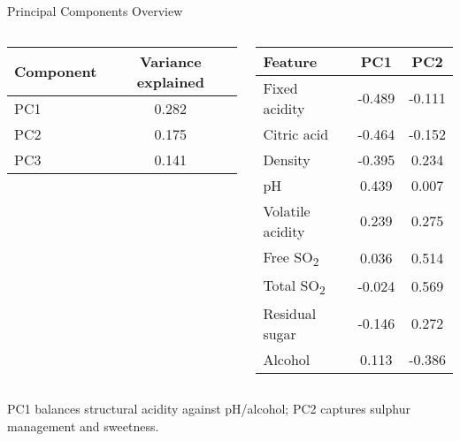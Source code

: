\documentclass[aspectratio=169]{beamer}
\begin{document}
\begin{frame}{Principal Components Overview}
  \begin{columns}[T,totalwidth=\textwidth]
    \begin{column}{0.45\textwidth}
      \small
      \begin{tabular}{lS[table-format=1.3]}
        \toprule
        Component & {Variance explained} \\
        \midrule
        PC1 & 0.282 \\
        PC2 & 0.175 \\
        PC3 & 0.141 \\
        \bottomrule
      \end{tabular}
    \end{column}
    \begin{column}{0.5\textwidth}
      \scriptsize
      \begin{tabular}{lS[table-format=1.3]S[table-format=1.3]}
        \toprule
        Feature & {PC1} & {PC2} \\
        \midrule
        Fixed acidity & -0.489 & -0.111 \\
        Citric acid & -0.464 & -0.152 \\
        Density & -0.395 & 0.234 \\
        pH & 0.439 & 0.007 \\
        Volatile acidity & 0.239 & 0.275 \\
        Free SO\textsubscript{2} & 0.036 & 0.514 \\
        Total SO\textsubscript{2} & -0.024 & 0.569 \\
        Residual sugar & -0.146 & 0.272 \\
        Alcohol & 0.113 & -0.386 \\
        \bottomrule
      \end{tabular}
    \end{column}
  \end{columns}
  \vspace{0.5em}
  \small PC1 balances structural acidity against pH/alcohol; PC2 captures sulphur management and sweetness.
\end{frame}
\end{document}
